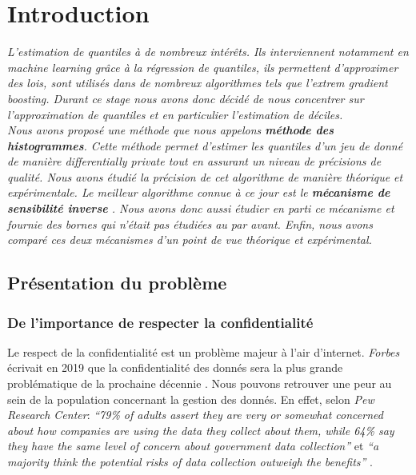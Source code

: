 \section{Introduction}
\vspace*{10pt}
\begin{adjustwidth}{30pt}{30pt}
\textit{L'estimation de quantiles à de nombreux intérêts. Ils interviennent notamment en \textit{machine learning} grâce à la régression de quantiles, ils permettent d'approximer des lois, sont utilisés dans de nombreux algorithmes tels que l'\textit{extrem gradient boosting}. Durant ce stage nous avons donc décidé de nous concentrer sur l'approximation de quantiles et en particulier l'estimation de déciles.}\\

\textit{Nous avons proposé une méthode que nous appelons \textbf{méthode des histogrammes}. Cette méthode permet d'estimer les quantiles d'un jeu de donné de manière \textit{differentially private} tout en assurant un niveau de précisions de qualité. Nous avons étudié la précision de cet algorithme de manière théorique et expérimentale. Le meilleur algorithme connue à ce jour est le \textbf{mécanisme de sensibilité inverse} \cite{Asi2020NearII}. Nous avons donc aussi étudier en parti ce mécanisme et fournie des bornes qui n'était pas étudiées au par avant. Enfin, nous avons comparé ces deux mécanismes d'un point de vue théorique et expérimental.}
\end{adjustwidth}
\vspace*{10pt}

\subsection{Présentation du problème}


\subsubsection{De l'importance de respecter la confidentialité}

Le respect de la confidentialité est un problème majeur à l'air d'internet. \textit{Forbes} écrivait en 2019 que la confidentialité des donnés sera la plus grande problématique de la prochaine décennie \cite{forbesdata}. Nous pouvons retrouver une peur au sein de la population concernant la gestion des donnés. En effet, selon \textit{Pew Research Center}: \textit{``79\% of adults assert they are very or somewhat concerned about how companies are using the data they collect about them, while 64\% say they have the same level of concern about government data collection''} et \textit{``a majority think the potential risks of data collection outweigh the benefits''} \cite{pew}.

